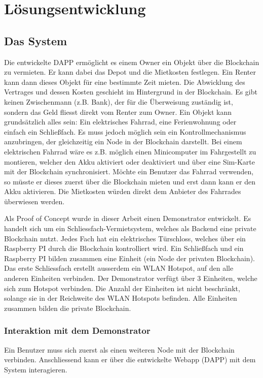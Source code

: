 \chapter{Lösungsentwicklung}
\label{cha:Lösungsentwicklung}

\section{Das System}
\label{cha:Das System}

Die entwickelte DAPP ermöglicht es einem Owner ein Objekt über die Blockchain zu vermieten. Er kann dabei das Depot und die Mietkosten festlegen. Ein Renter kann dann dieses Objekt für eine bestimmte Zeit mieten. Die Abwicklung des Vertrages und dessen Kosten geschieht im Hintergrund in der Blockchain. Es gibt keinen Zwischenmann (z.B. Bank), der für die Überweisung zuständig ist, sondern das Geld fliesst direkt vom Renter zum Owner. 
Ein Objekt kann grundsätzlich alles sein: Ein elektrisches Fahrrad, eine Ferienwohnung oder einfach ein Schließfach. Es muss jedoch möglich sein ein Kontrollmechanismus anzubringen, der gleichzeitig ein Node in der Blockchain darstellt. Bei einem elektrischen Fahrrad wäre es z.B. möglich einen Minicomputer im Fahrgestellt zu montieren, welcher den Akku aktiviert oder deaktiviert und über eine Sim-Karte mit der Blockchain synchronisiert. Möchte ein Benutzer das Fahrrad verwenden, so müsste er dieses zuerst über die Blockchain mieten und erst dann kann er den Akku aktivieren. Die Mietkosten würden direkt dem Anbieter des Fahrrades überwiesen werden.

\vspace{1em}
Als Proof of Concept wurde in dieser Arbeit einen Demonstrator entwickelt. Es handelt sich um ein Schliessfach-Vermietsystem, welches als Backend eine private Blockchain nutzt. Jedes Fach hat ein elektrisches Türschloss, welches über ein Raspberry PI durch die Blockchain kontrolliert wird. Ein Schließfach und ein Raspberry PI bilden zusammen eine Einheit (ein Node der privaten Blockchain). Das erste Schliessfach erstellt ausserdem ein WLAN Hotspot, auf den alle anderen Einheiten verbinden. Der Demonstrator verfügt über 3 Einheiten, welche sich zum Hotspot verbinden. Die Anzahl der Einheiten ist nicht beschränkt, solange sie in der Reichweite des WLAN Hotspots befinden. Alle Einheiten zusammen bilden die private Blockchain. 

\subsection{Interaktion mit dem Demonstrator}
Ein Benutzer muss sich zuerst als einen weiteren Node mit der Blockchain verbinden. Anschliessend kann er über die entwickelte Webapp (DAPP) mit dem System interagieren. 

